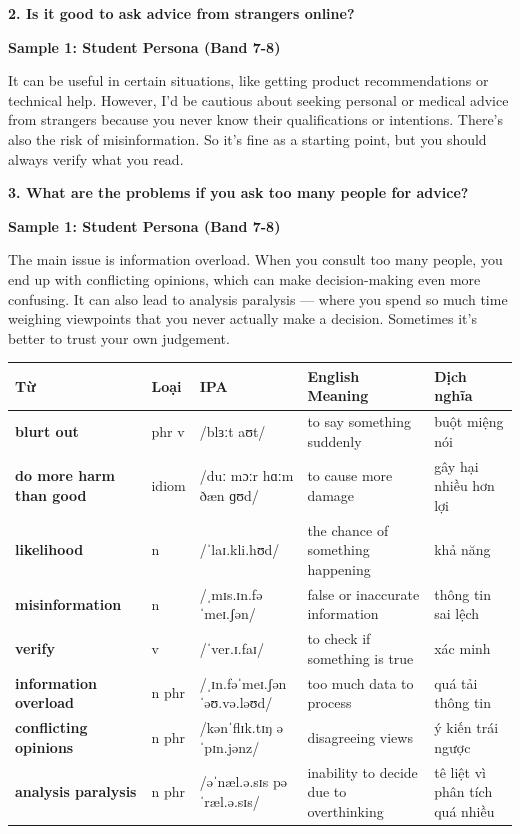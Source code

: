 \begin{ieltsquestion}
\textbf{2. Is it good to ask advice from strangers online?}
\end{ieltsquestion}
\textbf{Sample 1: Student Persona (Band 7-8)}

It can be useful in certain situations, like getting product recommendations or technical help. However, I'd be cautious about seeking personal or medical advice from strangers because you never know their qualifications or intentions. There's also the risk of misinformation. So it's fine as a starting point, but you should always verify what you read.

\separator

\begin{ieltsquestion}
\textbf{3. What are the problems if you ask too many people for advice?}
\end{ieltsquestion}
\textbf{Sample 1: Student Persona (Band 7-8)}

The main issue is information overload. When you consult too many people, you end up with conflicting opinions, which can make decision-making even more confusing. It can also lead to analysis paralysis — where you spend so much time weighing viewpoints that you never actually make a decision. Sometimes it's better to trust your own judgement.

\separator


\vspace{0.8em}
\begin{center}
\renewcommand{\arraystretch}{1.65}
\begin{tabularx}{\textwidth}{|V{0.22\textwidth}|C{0.07\textwidth}|I{0.20\textwidth}|Y|V{0.18\textwidth}|}
\hline
{}
\textbf{Từ} & \textbf{Loại} & \textbf{IPA} & \textbf{English Meaning} & \textbf{Dịch nghĩa} \\
\hline
\textbf{blurt out} & phr v & /blɜːt aʊt/ & to say something suddenly & buột miệng nói \\ \hline
\textbf{do more harm than good} & idiom & /duː mɔːr hɑːm ðæn ɡʊd/ & to cause more damage & gây hại nhiều hơn lợi \\ \hline
\textbf{likelihood} & n & /ˈlaɪ.kli.hʊd/ & the chance of something happening & khả năng \\ \hline
\textbf{misinformation} & n & /ˌmɪs.ɪn.fəˈmeɪ.ʃən/ & false or inaccurate information & thông tin sai lệch \\ \hline
\textbf{verify} & v & /ˈver.ɪ.faɪ/ & to check if something is true & xác minh \\ \hline
\textbf{information overload} & n phr & /ˌɪn.fəˈmeɪ.ʃən ˈəʊ.və.ləʊd/ & too much data to process & quá tải thông tin \\ \hline
\textbf{conflicting opinions} & n phr & /kənˈflɪk.tɪŋ əˈpɪn.jənz/ & disagreeing views & ý kiến trái ngược \\ \hline
\textbf{analysis paralysis} & n phr & /əˈnæl.ə.sɪs pəˈræl.ə.sɪs/ & inability to decide due to overthinking & tê liệt vì phân tích quá nhiều \\ \hline
\end{tabularx}
\end{center}

